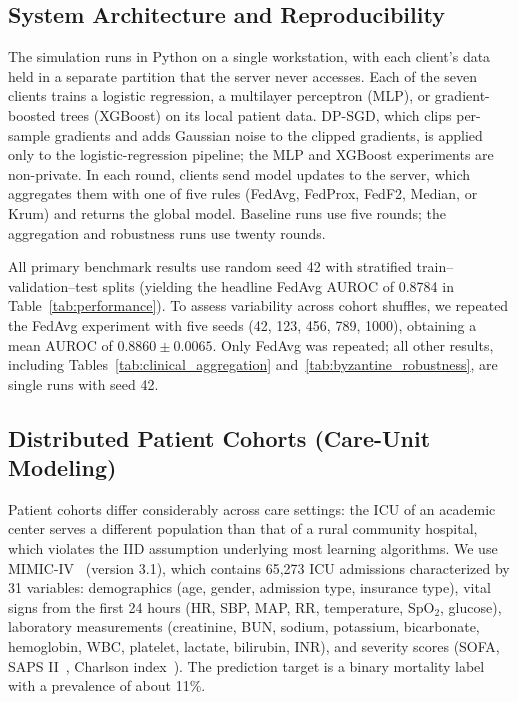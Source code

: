 \documentclass[journal]{IEEEtran}
\begin{document}
\subsection{System Architecture and Reproducibility}

The simulation runs in Python on a single workstation, with each client's data held in a separate partition that the server never accesses. Each of the seven clients trains a logistic regression, a multilayer perceptron (MLP), or gradient-boosted trees (XGBoost) on its local patient data. DP-SGD, which clips per-sample gradients and adds Gaussian noise to the clipped gradients, is applied only to the logistic-regression pipeline; the MLP and XGBoost experiments are non-private. In each round, clients send model updates to the server, which aggregates them with one of five rules (FedAvg, FedProx, FedF2, Median, or Krum) and returns the global model. Baseline runs use five rounds; the aggregation and robustness runs use twenty rounds.

All primary benchmark results use random seed 42 with stratified train--validation--test splits (yielding the headline FedAvg AUROC of 0.8784 in Table~\ref{tab:performance}). To assess variability across cohort shuffles, we repeated the FedAvg experiment with five seeds (42, 123, 456, 789, 1000), obtaining a mean AUROC of $0.8860 \pm 0.0065$. Only FedAvg was repeated; all other results, including Tables~\ref{tab:clinical_aggregation} and~\ref{tab:byzantine_robustness}, are single runs with seed 42.

\subsection{Distributed Patient Cohorts (Care-Unit Modeling)}

Patient cohorts differ considerably across care settings: the ICU of an academic center serves a different population than that of a rural community hospital, which violates the IID assumption underlying most learning algorithms. We use MIMIC-IV~\cite{PhysioNet-mimiciv-3.1,johnson2023mimic} (version 3.1), which contains 65,273 ICU admissions characterized by 31 variables: demographics (age, gender, admission type, insurance type), vital signs from the first 24 hours (HR, SBP, MAP, RR, temperature, SpO$_2$, glucose), laboratory measurements (creatinine, BUN, sodium, potassium, bicarbonate, hemoglobin, WBC, platelet, lactate, bilirubin, INR), and severity scores (SOFA, SAPS II~\cite{legall1993saps2}, Charlson index~\cite{charlson1987new}). The prediction target is a binary mortality label with a prevalence of about 11\%.
\end{document}
